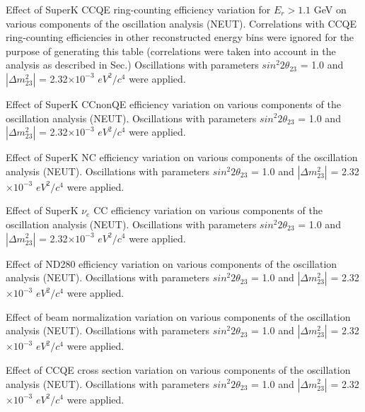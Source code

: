 %
%
%
%

\caption{ 
  Effect of SuperK CCQE ring-counting efficiency variation for $E_{r}>1.1$ GeV  
  on various components of the oscillation analysis (NEUT).
  Correlations with CCQE ring-counting efficiencies in other reconstructed energy bins were ignored for the purpose of generating
  this table (correlations were taken into account in the analysis as described in Sec.)
  Oscillations with parameters $sin^{2}2\theta_{23}$ = 1.0 and $|\Delta m^{2}_{23}|$ = 2.32$\times10^{-3}$ $eV^{2}/c^{4}$ were applied.  
}

%
%
%
%

\caption{ 
  Effect of SuperK CCnonQE efficiency variation
  on various components of the oscillation analysis (NEUT).
  Oscillations with parameters $sin^{2}2\theta_{23}$ = 1.0 and $|\Delta m^{2}_{23}|$ = 2.32$\times10^{-3}$ $eV^{2}/c^{4}$ were applied.  
}


%
%
%
%

\caption{ 
  Effect of SuperK NC efficiency variation
  on various components of the oscillation analysis (NEUT).
  Oscillations with parameters $sin^{2}2\theta_{23}$ = 1.0 and $|\Delta m^{2}_{23}|$ = 2.32$\times10^{-3}$ $eV^{2}/c^{4}$ were applied.  
}

%
%
%
%

\caption{ 
  Effect of SuperK $\nu_{e}$ CC efficiency variation
  on various components of the oscillation analysis (NEUT).
  Oscillations with parameters $sin^{2}2\theta_{23}$ = 1.0 and $|\Delta m^{2}_{23}|$ = 2.32$\times10^{-3}$ $eV^{2}/c^{4}$ were applied.  
}


%
%
%
%

\caption{ 
  Effect of ND280 efficiency variation
  on various components of the oscillation analysis (NEUT).
  Oscillations with parameters $sin^{2}2\theta_{23}$ = 1.0 and $|\Delta m^{2}_{23}|$ = 2.32$\times10^{-3}$ $eV^{2}/c^{4}$ were applied.  
}


%
%
%
%

\caption{ 
  Effect of beam normalization variation
  on various components of the oscillation analysis (NEUT).
  Oscillations with parameters $sin^{2}2\theta_{23}$ = 1.0 and $|\Delta m^{2}_{23}|$ = 2.32$\times10^{-3}$ $eV^{2}/c^{4}$ were applied.  
}


%
%
%
%

\caption{ 
  Effect of CCQE cross section variation
  on various components of the oscillation analysis (NEUT).
  Oscillations with parameters $sin^{2}2\theta_{23}$ = 1.0 and $|\Delta m^{2}_{23}|$ = 2.32$\times10^{-3}$ $eV^{2}/c^{4}$ were applied.  
}



